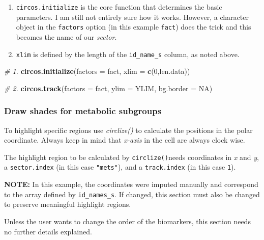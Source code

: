 \documentclass[
]{article}
\newenvironment{Shaded}{\begin{snugshade}}{\end{snugshade}}
\newcommand{\CommentTok}[1]{\textcolor[rgb]{0.56,0.35,0.01}{\textit{#1}}}
\newcommand{\DataTypeTok}[1]{\textcolor[rgb]{0.13,0.29,0.53}{#1}}
\newcommand{\DecValTok}[1]{\textcolor[rgb]{0.00,0.00,0.81}{#1}}
\newcommand{\KeywordTok}[1]{\textcolor[rgb]{0.13,0.29,0.53}{\textbf{#1}}}
\newcommand{\NormalTok}[1]{#1}
\newcommand{\OtherTok}[1]{\textcolor[rgb]{0.56,0.35,0.01}{#1}}
\providecommand{\tightlist}{%
  \setlength{\itemsep}{0pt}\setlength{\parskip}{0pt}}
\begin{document}
\begin{enumerate}
\def\labelenumi{\arabic{enumi}.}
\tightlist
\item
  \texttt{circos.initialize} is the core function that determines the
  basic parameters. I am still not entirely sure how it works. However,
  a character object in the \texttt{factors} option (in this example
  \texttt{fact}) does the trick and this becomes the name of our
  \emph{sector}.\\
\item
  \texttt{xlim} is defined by the length of the \texttt{id\_name\_s}
  column, as noted above.
\end{enumerate}

\begin{Shaded}
\begin{Highlighting}[]
\CommentTok{# 1.}
\KeywordTok{circos.initialize}\NormalTok{(}\DataTypeTok{factors =}\NormalTok{ fact, }\DataTypeTok{xlim =} \KeywordTok{c}\NormalTok{(}\DecValTok{0}\NormalTok{,len.data))}

\CommentTok{# 2.}
\KeywordTok{circos.track}\NormalTok{(}\DataTypeTok{factors =}\NormalTok{ fact, }\DataTypeTok{ylim =}\NormalTok{ YLIM, }\DataTypeTok{bg.border =} \OtherTok{NA}\NormalTok{)}
\end{Highlighting}
\end{Shaded}

\hypertarget{draw-shades-for-metabolic-subgroups}{%
\subsubsection{Draw shades for metabolic
subgroups}\label{draw-shades-for-metabolic-subgroups}}

To highlight specific regions use \emph{circlize()} to calculate the
positions in the polar coordinate. Always keep in mind that
\emph{x-axis} in the cell are always clock wise.

The highlight region to be calculated by \texttt{circlize()}needs
coordinates in \emph{x} and \emph{y}, a \texttt{sector.index} (in this
case \texttt{"mets"}), and a \texttt{track.index} (in this case
\texttt{1}).

\textbf{NOTE:} In this example, the coordinates were imputed manually
and correspond to the array defined by \texttt{id\_names\_s}. If
changed, this section must also be changed to preserve meaningful
highlight regions.

Unless the user wants to change the order of the biomarkers, this
section needs no further details explained.
\end{document}
